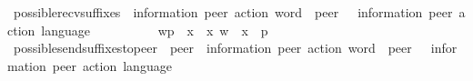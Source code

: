 \begin{isabellebody}
{}
\isamarkuptrue%
%
\endisatagdocument
{\isafolddocument}%
%
\isadelimdocument
%
\endisadelimdocument
{}\isamarkupfalse%
\ possible{\isacharunderscore}{\kern0pt}recv{\isacharunderscore}{\kern0pt}suffixes\ {\isacharcolon}{\kern0pt}{\isacharcolon}{\kern0pt}\ {\isachardoublequoteopen}{\isacharparenleft}{\kern0pt}{\isacharprime}{\kern0pt}information{\isacharcomma}{\kern0pt}\ {\isacharprime}{\kern0pt}peer{\isacharparenright}{\kern0pt}\ action\ word\ {\isasymRightarrow}\ {\isacharprime}{\kern0pt}peer\ {\isasymRightarrow}\ \ {\isacharparenleft}{\kern0pt}{\isacharprime}{\kern0pt}information{\isacharcomma}{\kern0pt}\ {\isacharprime}{\kern0pt}peer{\isacharparenright}{\kern0pt}\ action\ language{\isachardoublequoteclose}\ \ {\isacharparenleft}{\kern0pt}{\isachardoublequoteopen}{\isasymddagger}{\isacharunderscore}{\kern0pt}{\isasymddagger}\isactrlsub {\isacharunderscore}{\kern0pt}{\isachardoublequoteclose}\ {\isacharbrackleft}{\kern0pt}{}{}{\isacharcomma}{\kern0pt}\ {}{}{\isacharbrackright}{\kern0pt}\ {}{}{}{\isacharparenright}{\kern0pt}\ \ \ \isanewline
\ \ {\isachardoublequoteopen}{\isasymddagger}w{\isasymddagger}\isactrlsub p\ {\isasymequiv}\ {\isacharbraceleft}{\kern0pt}x{\isasymdown}\isactrlsub {\isacharquery}{\kern0pt}\ {\isacharbar}{\kern0pt}\ x{\isachardot}{\kern0pt}\ {\isacharparenleft}{\kern0pt}w\ {\isasymsqdot}\ x{\isacharparenright}{\kern0pt}\ {\isasymin}\ {\isasymL}\isactrlsup {\isacharasterisk}{\kern0pt}{\isacharparenleft}{\kern0pt}p{\isacharparenright}{\kern0pt}{\isacharbraceright}{\kern0pt}{\isachardoublequoteclose}\isanewline
\isanewline
\isanewline
{}\isamarkupfalse%
\ possible{\isacharunderscore}{\kern0pt}send{\isacharunderscore}{\kern0pt}suffixes{\isacharunderscore}{\kern0pt}to{\isacharunderscore}{\kern0pt}peer\ {\isacharcolon}{\kern0pt}{\isacharcolon}{\kern0pt}\ {\isachardoublequoteopen}{\isacharprime}{\kern0pt}peer\ {\isasymRightarrow}\ {\isacharparenleft}{\kern0pt}{\isacharprime}{\kern0pt}information{\isacharcomma}{\kern0pt}\ {\isacharprime}{\kern0pt}peer{\isacharparenright}{\kern0pt}\ action\ word\ {\isasymRightarrow}\ {\isacharprime}{\kern0pt}peer\ {\isasymRightarrow}\ \ {\isacharparenleft}{\kern0pt}{\isacharprime}{\kern0pt}information{\isacharcomma}{\kern0pt}\ {\isacharprime}{\kern0pt}peer{\isacharparenright}{\kern0pt}\ action\ language{\isachardoublequoteclose}\ \ {\isacharparenleft}{\kern0pt}{\isachardoublequoteopen}\isactrlsub {\isacharunderscore}{\kern0pt}{\isasymddagger}{\isacharunderscore}{\kern0pt}{\isasymddagger}\isactrlsub {\isacharunderscore}{\kern0pt}{\isachardoublequoteclose}\ {\isacharbrackleft}{\kern0pt}{}{}{\isacharcomma}{\kern0pt}\ {}{}{\isacharcomma}{\kern0pt}\ {}{}{\isacharbrackright}{\kern0pt}\ {}{}{}{\isacharparenright}{\kern0pt}\ \ \ \isanewline

\end{isabellebody}
